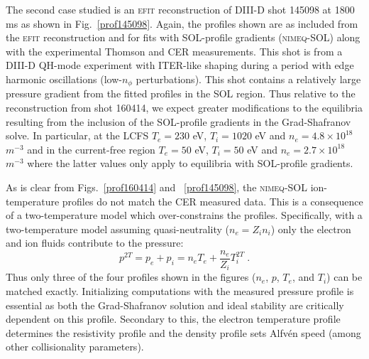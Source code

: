 \documentclass[english,aps,superscriptaddress,showkeys,showpacs,prepri,twocolumn]{revtex4}
\begin{document}
The second case studied is an \textsc{efit} reconstruction of DIII-D shot
145098 at 1800 ms as shown in Fig.~\ref{prof145098}.  Again, the profiles shown
are as included from the \textsc{efit} reconstruction and for fits with SOL-profile 
gradients (\textsc{nimeq}-SOL) along with the experimental Thomson and
CER measurements.  This shot is from a DIII-D QH-mode experiment with ITER-like
shaping during a period with edge harmonic oscillations (low-$n_\phi$
perturbations).  This shot contains a relatively large pressure gradient from
the fitted profiles in the SOL region. Thus relative to the reconstruction from
shot 160414, we expect greater modifications to the equilibria resulting from
the inclusion of the SOL-profile gradients in the Grad-Shafranov solve.  In
particular, at the LCFS $T_e=230$ eV, $T_i=1020$ eV and $n_e=4.8\times10^{18}$
$m^{-3}$ and in the current-free region $T_e=50$ eV, $T_i=50$ eV and
$n_e=2.7\times10^{18}$ $m^{-3}$ where the latter values only apply to
equilibria with SOL-profile gradients.

As is clear from Figs.~\ref{prof160414} and ~\ref{prof145098}, the
\textsc{nimeq}-SOL ion-temperature profiles do not match the CER measured data.
This is a consequence of a two-temperature model which over-constrains the
profiles.  Specifically, with a two-temperature model assuming quasi-neutrality
($n_e = Z_{i} n_i$) only the electron and ion fluids contribute to the
pressure:
\begin{equation}
      p^{2T}=p_e + p_i =  n_e T_e + \frac{n_e}{Z_i} T_i^{2T}\;.
      \label{eq:2flP}
\end{equation}
Thus only three of the four profiles shown in the figures ($n_e$, $p$, $T_e$,
and $T_i$) can be matched exactly.  Initializing computations with the measured
pressure profile is essential as both the Grad-Shafranov solution and ideal
stability are critically dependent on this profile. Secondary to this, the
electron temperature profile determines the resistivity profile and the density
profile sets Alfv\'en speed (among other collisionality parameters). 
\end{document}
